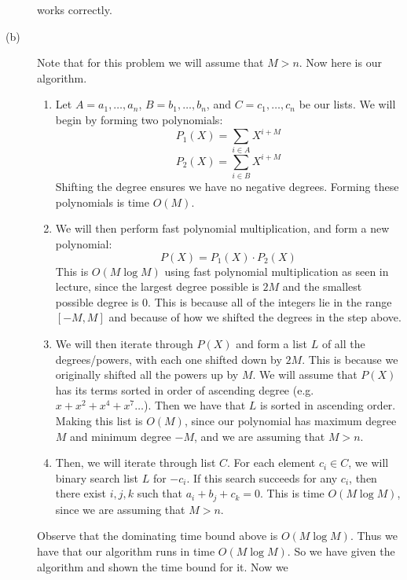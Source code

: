 \documentclass{article}
\begin{document}
\begin{description}
        works correctly.
    \item[(b)]
        Note that for this problem we will assume that $M > n$. Now here is our
        algorithm.
        \begin{enumerate}
            \item Let $A = a_1, \dots, a_n$,
                $B = b_1, \dots, b_n$, and $C = c_1, \dots, c_n$ be our lists.
                We will begin by forming two polynomials:
                \[ P_1(X) = \sum_{i \in A} X^{i+M} \]
                \[ P_2(X) = \sum_{i \in B} X^{i+M} \]
                Shifting the degree ensures we have no negative degrees. Forming
                these polynomials is time $O(M)$.
            \item We will then perform fast polynomial multiplication, and form a new
                polynomial:
                \[ P(X) = P_1(X) \cdot P_2(X) \]
                This is $O(M \log M)$ using fast polynomial multiplication as
                seen in lecture, since the largest degree possible is $2M$
                and the smallest possible degree is $0$. This is because
                all of the integers lie in the range $[-M, M]$ and because of
                how we shifted the degrees in the step above.
            \item We will then iterate through $P(X)$ and form a list $L$ of all
                the degrees/powers, with each one shifted down by $2M$. This
                is because we originally shifted all the powers up by $M$.
                We will assume that $P(X)$ has its terms
                sorted in order of ascending degree (e.g. $x + x^2 + x^4 + x^7
                \dots$). Then we have that $L$ is sorted in ascending order.
                Making this list is $O(M)$, since our polynomial has maximum
                degree $M$ and minimum degree $-M$, and we are assuming that
                $M > n$.
            \item Then, we will iterate through list $C$. For each element $c_i
                \in C$, we will binary search list $L$ for $-c_i$. If this
                search succeeds for any $c_i$, then there exist $i,j,k$ such that
                $a_i + b_j + c_k = 0$. This is time $O(M \log M)$, since we are
                assuming that $M>n$.
        \end{enumerate}
        Observe that the dominating time bound above is $O(M \log M)$. Thus we have
        that our algorithm runs in time $O(M \log M)$.
        So we have given the algorithm and shown the time bound for it. Now we

\end{description}
\end{document}
